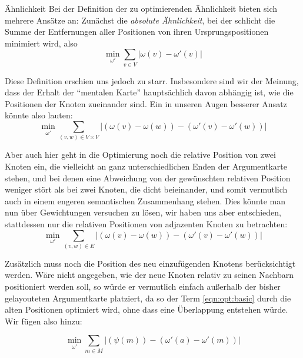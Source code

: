\begin{paragraph}{Ähnlichkeit}
  Bei der Definition der zu optimierenden Ähnlichkeit bieten sich mehrere Ansätze an: Zunächst die \textit{absolute Ähnlichkeit}, bei der schlicht die Summe der Entfernungen aller Positionen von ihren Ursprungspositionen minimiert wird, also
  \begin{equation}
    \min_{\omega'} \sum \limits_{v \in V} {|\omega(v) - \omega'(v)|}
  \end{equation}

  Diese Definition erschien uns jedoch zu starr. Insbesondere sind wir der Meinung, dass der Erhalt der "`mentalen Karte"' hauptsächlich davon abhängig ist, wie die Positionen der Knoten zueinander sind. Ein in unseren Augen besserer Ansatz könnte also lauten:
  \begin{equation}
    \min_{\omega'} \sum \limits_{(v,w) \in V \times V} {|(\omega(v) - \omega(w)) - (\omega'(v) - \omega'(w))|}
  \end{equation}

  Aber auch hier geht in die Optimierung noch die relative Position von zwei Knoten ein, die vielleicht an ganz unterschiedlichen Enden der Argumentkarte stehen, und bei denen eine Abweichung von der gewünschten relativen Position weniger stört als bei zwei Knoten, die dicht beieinander, und somit vermutlich auch in einem engeren semantischen Zusammenhang stehen. Dies könnte man nun über Gewichtungen versuchen zu lösen, wir haben uns aber entschieden, stattdessen nur die relativen Positionen von adjazenten Knoten zu betrachten:
  \begin{equation}
    \label{eqn:opt:basic}
    \min_{\omega'} \sum \limits_{(v,w) \in E} {|(\omega(v) - \omega(w)) - (\omega'(v) - \omega'(w))|}
  \end{equation}
\end{paragraph}

Zusätzlich muss noch die Position des neu einzufügenden Knotens berücksichtigt werden. Wäre nicht angegeben, wie der neue Knoten relativ zu seinen Nachbarn positioniert werden soll, so würde er vermutlich einfach außerhalb der bisher gelayouteten Argumentkarte platziert, da so der Term \ref{eqn:opt:basic} durch die alten Positionen optimiert wird, ohne dass eine Überlappung entstehen würde. Wir fügen also hinzu:

\begin{equation}
  \label{eqn:opt:new}
  \min_{\omega'} \sum \limits_{m \in M} {|(\psi(m)) - (\omega'(a) - \omega'(m))|}
\end{equation}

